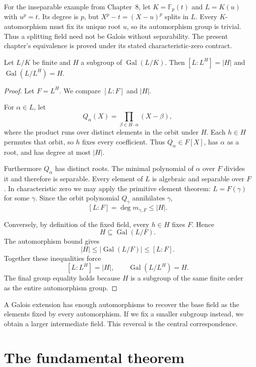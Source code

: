 For the inseparable example from Chapter~8, let $K=\mathbb F_p(t)$ and
$L=K(u)$ with $u^p=t$. Its degree is $p$, but
$X^p-t=(X-u)^p$ splits in $L$. Every $K$-automorphism must fix its unique
root $u$, so its automorphism group is trivial. Thus a splitting field
need not be Galois without separability. The present chapter's equivalence
is proved under its stated characteristic-zero contract.

\begin{lemma}[Artin]\label{lem:artin}
Let $L/K$ be finite and $H$ a subgroup of $\operatorname{Gal}(L/K)$. Then $[L:L^H]=|H|$ and $\operatorname{Gal}(L/L^H)=H$.
\end{lemma}
\begin{proof}
Let $F=L^H$. We compare $[L:F]$ and $|H|$.

For $\alpha\in L$, let
\[
Q_\alpha(X)=\prod_{\beta\in H\cdot\alpha}(X-\beta),
\]
where the product runs over distinct elements
in the orbit under $H$. Each $h\in H$ permutes
that orbit, so $h$ fixes every coefficient.
Thus $Q_\alpha\in F[X]$, has $\alpha$ as a
root, and has degree at most $|H|$.

Furthermore $Q_\alpha$ has distinct roots.
The minimal polynomial of $\alpha$ over $F$
divides it and therefore is separable.
Every element of $L$ is algebraic and
separable over $F$. In characteristic
zero we may apply the primitive element
theorem: $L=F(\gamma)$ for some $\gamma$.
Since the orbit polynomial $Q_\gamma$
annihilates $\gamma$,
\[
[L:F]=\deg m_{\gamma,F}\le|H|.
\]

Conversely, by definition of the fixed field,
every $h\in H$ fixes $F$. Hence
\[
H\subseteq\operatorname{Gal}(L/F).
\]
The automorphism bound gives
\[
|H|\le|\operatorname{Gal}(L/F)|\le[L:F].
\]
Together these inequalities force
\[
\boxed{[L:L^H]=|H|,\qquad
\operatorname{Gal}(L/L^H)=H}.
\]
The final group equality holds because $H$
is a subgroup of the same finite order
as the entire automorphism group.
\end{proof}

A Galois extension has enough automorphisms to recover the base field as the elements fixed by every automorphism. If we fix a smaller subgroup instead, we obtain a larger intermediate field. This reversal is the central correspondence.

\section{The fundamental theorem}

